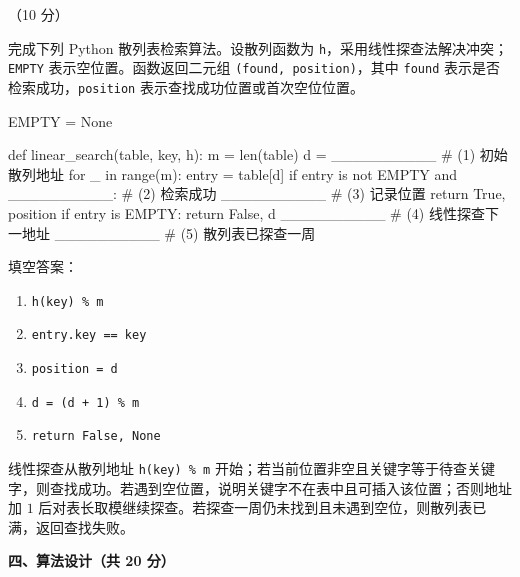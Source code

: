 \begin{question}[散列表检索]（10 分）

完成下列 Python 散列表检索算法。设散列函数为 \texttt{h}，采用线性探查法解决冲突；\texttt{EMPTY} 表示空位置。函数返回二元组 \texttt{(found, position)}，其中 \texttt{found} 表示是否检索成功，\texttt{position} 表示查找成功位置或首次空位位置。

\begin{pycode}
EMPTY = None


def linear_search(table, key, h):
    m = len(table)
    d = __________                              # (1) 初始散列地址
    for _ in range(m):
        entry = table[d]
        if entry is not EMPTY and __________:   # (2) 检索成功
            __________                          # (3) 记录位置
            return True, position
        if entry is EMPTY:
            return False, d
        __________                              # (4) 线性探查下一地址
    __________                                  # (5) 散列表已探查一周
\end{pycode}

\begin{solution}
填空答案：
\begin{enumerate}
  \item \texttt{h(key) \% m}
  \item \texttt{entry.key == key}
  \item \texttt{position = d}
  \item \texttt{d = (d + 1) \% m}
  \item \texttt{return False, None}
\end{enumerate}
线性探查从散列地址 \texttt{h(key) \% m} 开始；若当前位置非空且关键字等于待查关键字，则查找成功。若遇到空位置，说明关键字不在表中且可插入该位置；否则地址加 $1$ 后对表长取模继续探查。若探查一周仍未找到且未遇到空位，则散列表已满，返回查找失败。
\end{solution}
\end{question}
\clearpage

\textbf{四、算法设计（共 20 分）}



